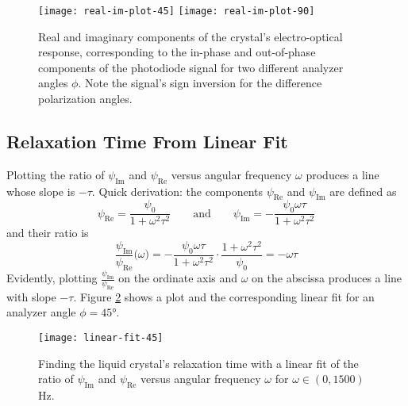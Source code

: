 \documentclass[11pt, a4paper]{article}
\newcommand{\eqtext}[1]{\qquad \text{#1} \qquad}
\begin{document}
\begin{figure}[htb!]
\centering
\texttt{[image: real-im-plot-45]} \vfill
\vspace{-7mm}
\texttt{[image: real-im-plot-90]} \vfill

\caption{Real and imaginary components of the crystal's electro-optical response, corresponding to the in-phase and out-of-phase components of the photodiode signal for two different analyzer angles $ \phi $. Note the signal's sign inversion for the difference polarization angles.}
\label{eleopt:fig:eleopt-response}
\end{figure}

\subsection{Relaxation Time From Linear Fit} \label{eleopt:ss:tau-linear-fit}
Plotting the ratio of $ \psi_{\text{Im}} $ and $ \psi_{\text{Re}} $ versus angular frequency $ \omega $ produces a line whose slope is $ -\tau $. Quick derivation: the components $ \psi_{\text{Re}} $ and  $ \psi_{\text{Im}} $  are defined as
\begin{equation}
	\psi_{\text{Re}} = \frac{\psi_{0}}{1 + \omega^{2}\tau^{2}} \eqtext{and} \psi_{\text{Im}} = - \frac{\psi_{0}\omega \tau}{1 + \omega^{2}\tau^{2}} \label{eleopt:eq:phi-im-re}
\end{equation}
and their ratio is
\begin{equation*}
	\frac{\psi_{\text{Im}}}{\psi_{\text{Re}}}\big(\omega\big) = - \frac{\psi_{0}\omega \tau}{1 + \omega^{2}\tau^{2}} \cdot \frac{1 + \omega^{2}\tau^{2}}{\psi_{0}} = - \omega \tau
\end{equation*}
Evidently, plotting $ \frac{\psi_{\text{Im}}}{\psi_{\text{Re}}} $ on the ordinate axis and $ \omega $ on the abscissa produces a line with slope $ -\tau $. Figure \ref{eleopt:fig:tau-linear-fit} shows a plot and the corresponding linear fit for an analyzer angle $ \phi = \ang{45} $. 


\begin{figure}[htb!]
\centering
\texttt{[image: linear-fit-45]} \vfill

\caption{Finding the liquid crystal's relaxation time with a linear fit of the ratio of $ \psi_{\text{Im}} $ and $ \psi_{\text{Re}} $ versus angular frequency $ \omega $ for $ \omega \in (0, 1500)$ \si{\hertz}.}
\label{eleopt:fig:tau-linear-fit}
\end{figure}
\end{document}
